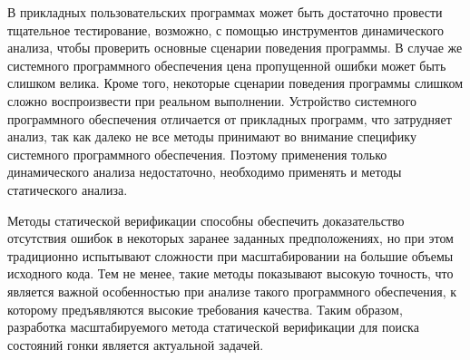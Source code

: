 В прикладных пользовательских программах может быть достаточно провести тщательное тестирование, возможно, с помощью инструментов динамического анализа, чтобы проверить основные сценарии поведения программы.
В случае же системного программного обеспечения цена пропущенной ошибки может быть слишком велика.
Кроме того, некоторые сценарии поведения программы слишком сложно воспроизвести при реальном выполнении.
Устройство системного программного обеспечения отличается от прикладных программ, что затрудняет анализ, так как далеко не все методы принимают во внимание специфику системного программного обеспечения.
Поэтому применения только динамического анализа недостаточно, необходимо применять и методы статического анализа.

Методы статической верификации способны обеспечить доказательство отсутствия ошибок в некоторых заранее заданных предположениях, но при этом традиционно испытывают сложности при масштабировании на большие объемы исходного кода.
Тем не менее, такие методы показывают высокую точность, что является важной особенностью при анализе такого программного обеспечения, к которому предъявляются высокие требования качества.
Таким образом, разработка масштабируемого метода статической верификации для поиска состояний гонки является актуальной задачей.

